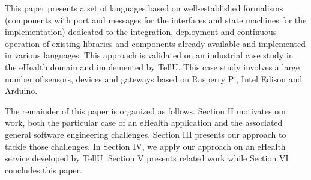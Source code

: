 This paper presents a set of languages based on well-established formalisms (components with port and messages for the interfaces and state machines for the implementation)  dedicated to the integration, deployment and continuous operation of existing libraries and components already available and implemented in various languages. This approach is validated on an industrial case study in the eHealth domain and implemented by TellU. This case study involves a large number of sensors, devices and gateways based on Rasperry Pi, Intel Edison and Arduino. 

The remainder of this paper is organized as follows. Section II  motivates our work, both the particular case of an eHealth application and the associated general software engineering challenges. Section III presents our approach to tackle those challenges. In Section IV, we apply our approach on an eHealth service developed by TellU. Section V presents related work while Section VI concludes this paper. %
